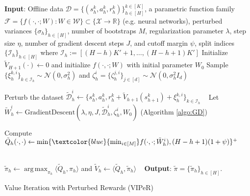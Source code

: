 \documentclass{article} \usepackage{iclr2023/iclr2023_conference,times}
\DeclareMathOperator*{\argmax}{arg\,max}
\begin{document}
\begin{algorithm}[t]
\begin{algorithmic}[1]
\State \textbf{Input}: Offline data $ \mathcal{D} = \{(s_h^k, a_h^k, r_h^k)\}_{h \in [H]}^{k \in [K]} $, a parametric function family $\mathcal{F} = \{f(\cdot, \cdot; W): W \in \mathcal{W}\} \subset \{\mathcal{X} \rightarrow \mathbb{R}\}$ (e.g. neural networks), perturbed variances $\{\sigma_h\}_{h \in [H]}$, number of bootstraps $M$, regularization parameter $\lambda$, step size $\eta$, number of gradient descent steps $J$, and cutoff margin $\psi$, split indices $\{\mathcal{I}_h\}_{h \in [H]}$ where $\mathcal{I}_{h} := [(H-h) K' + 1, \ldots, (H - h+1) K']$
\State Initialize $\tilde{V}_{H+1}(\cdot) \leftarrow 0$ and initialize $f(\cdot, \cdot; W)$ with initial parameter $W_0$
\State Sample $\{\xi^{k, i}_h\}_{k \in \mathcal{I}_h} \sim \mathcal{N}(0, \sigma^2_h)$ and $\zeta^i_h = \{\zeta^{j, i}_h\}_{j \in [d]} \sim \mathcal{N}(0, \sigma^2_h I_d)$
\label{PERVI: sample noises}


\State Perturb the dataset $\tilde{\mathcal{D}}^i_h \leftarrow \{s^k_h, a^k_h, r^k_h + \tilde{V}_{h+1}(s^k_{h+1}) + \xi^{k, i}_h\}_{k \in \mathcal{I}_h}$ ~
\label{PERVI: perturb data}
\State Let $\tilde{W}^i_h \leftarrow \textrm{GradientDescent}(\lambda, \eta, J, \tilde{\mathcal{D}}^i_h, \zeta^i_h, W_0)$ (Algorithm \ref{algo:GD}) 
\label{PERVI: GD}

\EndFor 

\State Compute $\tilde{Q}_h(\cdot, \cdot) \leftarrow \min \{ \textcolor{blue}{\min_{i \in [M]}} f(\cdot, \cdot; \tilde{W}^i_h), (H - h +1)(1 + \psi) \}^{+}$  ~~~~
\label{PERVI: minimum of ensemble}






\State $\tilde{\pi}_{h} \leftarrow \argmax_{\pi_{h}}\langle \tilde{Q}_{h}, \pi_{h} \rangle$ and $\tilde{V}_h \leftarrow \langle \tilde{Q}_{h}, \tilde{\pi}_{h} \rangle$ \qquad~
\label{PERVI: greedy policy}
\EndFor
\State \textbf{Output}: $\tilde{\pi} = \{ \tilde{\pi}_h \}_{h \in [H]}$.
\end{algorithmic}
\caption{{Value Iteration with Perturbed Rewards (VIPeR)}}
\label{algorithm: PERVI}
\end{algorithm}
\end{document}
